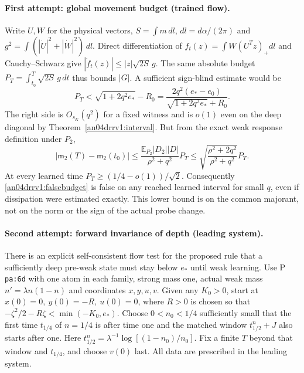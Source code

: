 \documentclass[11pt]{article}
\begin{document}
\paragraph{First attempt: global movement budget (trained flow).}
Write $U,W$ for the physical vectors, $S=\int m\,dl$,
$dl=d\alpha/(2\pi)$ and
$g^2=\int(|\dot U|^2+|\dot W|^2)\,dl$. Direct differentiation of
$f_t(z)=\int W(U^Tz)_+dl$ and Cauchy--Schwarz give
$|\dot f_t(z)|\le |z|\sqrt{2S}\,g$. The same absolute budget
$P_T=\int_{t_0}^T\sqrt{2S}\,g\,dt$ thus bounds $|G|$.
A sufficient sign-blind estimate would be
\begin{equation}\label{an04drrv1:falsebudget}
 P_T<\sqrt{1+2q^2e_*}-R_0
 =\frac{2q^2(e_*-e_0)}{\sqrt{1+2q^2e_*}+R_0}.
\end{equation}
The right side is $O_{s_K}(q^2)$ for a fixed witness and is $o(1)$
even on the deep diagonal by Theorem~\ref{an04drrv1:interval}.
But from the exact weak response definition under $P_2$,
\[
 |\mathsf m_2(T)-\mathsf m_2(t_0)|
 \le\frac{\mathbb E_{P_2}|D_2||D|}{\rho^2+q^2}P_T
 \le\sqrt{\frac{\rho^2+2q^2}{\rho^2+q^2}}P_T .
\]
At every learned time $P_T\ge(1/4-o(1))/\sqrt2$.
Consequently \eqref{an04drrv1:falsebudget} is false on any
reached learned interval for small $q$, even if dissipation were
estimated exactly. This lower bound is on the common majorant,
not on the norm or the sign of the actual probe change.

\paragraph{Second attempt: forward invariance of depth (leading system).}
There is an explicit self-consistent flow test for the proposed rule
that a sufficiently deep pre-weak state must stay below $e_*$ until
weak learning. Use P \texttt{pa:6d} with one atom in each family,
strong mass one, actual weak mass $n'=\lambda n(1-n)$ and coordinates
$x,y,u,v$. Given any $K_0>0$, start at
$x(0)=0,\ y(0)=-R,\ u(0)=0$, where $R>0$ is chosen so that
$-\zeta^2/2-R\zeta<\min(-K_0,e_*)$.
Choose $0<n_0<1/4$ sufficiently small that the first time
$t_{1/4}$ of $n=1/4$ is after time one and the matched window
$t_{1/2}^{n}+J$ also starts after one. Here
$t_{1/2}^{n}=\lambda^{-1}\log[(1-n_0)/n_0]$.
Fix a finite $T$ beyond that window and $t_{1/4}$, and choose $v(0)$
last. All data are prescribed in the leading system.
\end{document}
